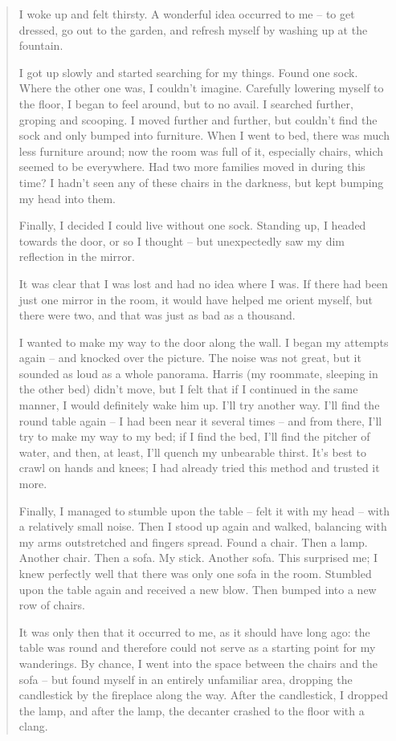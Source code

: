 \begin{quote}
I woke up and felt thirsty. A wonderful idea occurred to me -- to get dressed, go out to the garden, and refresh myself by washing up at the fountain.

I got up slowly and started searching for my things. Found one sock. Where the other one was, I couldn't imagine. Carefully lowering myself to the floor, I began to feel around, but to no avail. I searched further, groping and scooping. I moved further and further, but couldn't find the sock and only bumped into furniture. When I went to bed, there was much less furniture around; now the room was full of it, especially chairs, which seemed to be everywhere. Had two more families moved in during this time? I hadn't seen any of these chairs in the darkness, but kept bumping my head into them.

Finally, I decided I could live without one sock. Standing up, I headed towards the door, or so I thought -- but unexpectedly saw my dim reflection in the mirror.

It was clear that I was lost and had no idea where I was. If there had been just one mirror in the room, it would have helped me orient myself, but there were two, and that was just as bad as a thousand.

I wanted to make my way to the door along the wall. I began my attempts again -- and knocked over the picture. The noise was not great, but it sounded as loud as a whole panorama. Harris (my roommate, sleeping in the other bed) didn't move, but I felt that if I continued in the same manner, I would definitely wake him up. I'll try another way. I'll find the round table again -- I had been near it several times -- and from there, I'll try to make my way to my bed; if I find the bed, I'll find the pitcher of water, and then, at least, I'll quench my unbearable thirst. It's best to crawl on hands and knees; I had already tried this method and trusted it more.

Finally, I managed to stumble upon the table -- felt it with my head -- with a relatively small noise. Then I stood up again and walked, balancing with my arms outstretched and fingers spread. Found a chair. Then a lamp. Another chair. Then a sofa. My stick. Another sofa. This surprised me; I knew perfectly well that there was only one sofa in the room. Stumbled upon the table again and received a new blow. Then bumped into a new row of chairs.

It was only then that it occurred to me, as it should have long ago: the table was round and therefore could not serve as a starting point for my wanderings. By chance, I went into the space between the chairs and the sofa -- but found myself in an entirely unfamiliar area, dropping the candlestick by the fireplace along the way. After the candlestick, I dropped the lamp, and after the lamp, the decanter crashed to the floor with a clang.


\end{quote}
